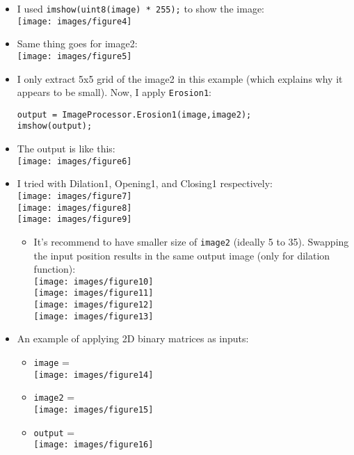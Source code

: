 \documentclass[11pt]{amsart}
\theoremstyle{remark}
\providecommand{\tightlist}{%
  \setlength{\itemsep}{0pt}\setlength{\parskip}{0pt}}
\theoremstyle{definition}
\theoremstyle{remark}
\numberwithin{equation}{section}
\begin{document}
\begin{itemize}
  \begin{itemize}
  \item
    I used \texttt{imshow(uint8(image)\ *\ 255);} to show the image:\\
    \texttt{[image: images/figure4]}\\
  \item
    Same thing goes for image2:\\
    \texttt{[image: images/figure5]}\\
  \item
    I only extract 5x5 grid of the image2 in this example (which
    explains why it appears to be small). Now, I apply
    \texttt{Erosion1}:

\begin{verbatim}
output = ImageProcessor.Erosion1(image,image2);
imshow(output);
\end{verbatim}
  \item
    The output is like this:\\
    \texttt{[image: images/figure6]}\\
  \item
    I tried with Dilation1, Opening1, and Closing1 respectively:\\
    \texttt{[image: images/figure7]}\\
    \texttt{[image: images/figure8]}\\
    \texttt{[image: images/figure9]}

    \begin{itemize}
    \tightlist
    \item
      It's recommend to have smaller size of \texttt{image2} (ideally 5
      to 35). Swapping the input position results in the same output
      image (only for dilation function):\\
      \texttt{[image: images/figure10]}\\
      \texttt{[image: images/figure11]}\\
      \texttt{[image: images/figure12]}\\
      \texttt{[image: images/figure13]}
    \end{itemize}
  \item
    An example of applying 2D binary matrices as inputs:

    \begin{itemize}
    \tightlist
    \item
      \texttt{image} =\\
      \texttt{[image: images/figure14]}\\
    \item
      \texttt{image2} =\\
      \texttt{[image: images/figure15]}\\
    \item
      \texttt{output} =\\
      \texttt{[image: images/figure16]}
    \end{itemize}
  \end{itemize}
\end{itemize}
\end{document}
